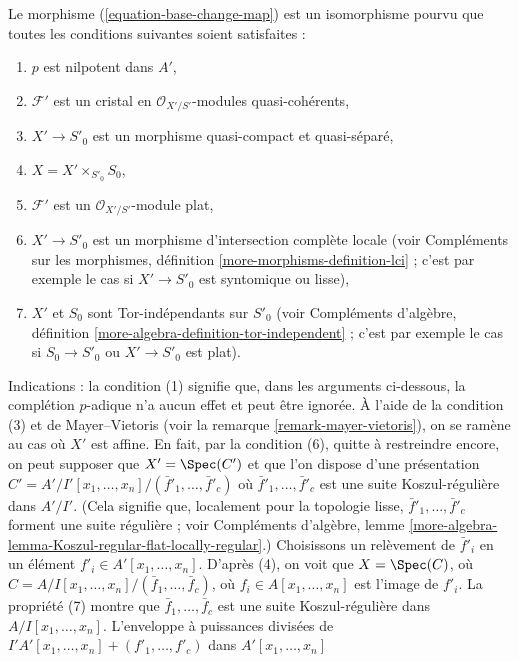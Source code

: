 \begin{remark}
\label{remark-base-change-isomorphism}
Le morphisme (\ref{equation-base-change-map}) est un isomorphisme pourvu que
toutes les conditions suivantes soient satisfaites :
\begin{enumerate}
\item $p$ est nilpotent dans $A'$,
\item $\mathcal{F}'$ est un cristal en
$\mathcal{O}_{X'/S'}$-modules quasi-cohérents,
\item $X' \to S'_0$ est un morphisme quasi-compact et quasi-séparé,
\item $X = X' \times_{S'_0} S_0$,
\item $\mathcal{F}'$ est un $\mathcal{O}_{X'/S'}$-module plat,
\item $X' \to S'_0$ est un morphisme d'intersection complète locale (voir
Compléments sur les morphismes, définition \ref{more-morphisms-definition-lci} ; c'est
par exemple le cas si $X' \to S'_0$ est syntomique ou lisse),
\item $X'$ et $S_0$ sont Tor-indépendants sur $S'_0$ (voir
Compléments d'algèbre, définition \ref{more-algebra-definition-tor-independent} ;
c'est par exemple le cas si $S_0 \to S'_0$ ou $X' \to S'_0$ est plat).
\end{enumerate}
Indications : la condition (1) signifie que, dans les arguments ci-dessous, la complétion $p$-adique
n'a aucun effet et peut être ignorée.
À l'aide de la condition (3) et de Mayer--Vietoris (voir la
remarque \ref{remark-mayer-vietoris}), on se ramène au cas
où $X'$ est affine. En fait, par la condition (6), quitte à restreindre encore,
on peut supposer que $X' = \Spec(C')$ et que l'on dispose d'une présentation
$C' = A'/I'[x_1, \ldots, x_n]/(\bar f'_1, \ldots, \bar f'_c)$
où $\bar f'_1, \ldots, \bar f'_c$ est une suite Koszul-régulière dans $A'/I'$.
(Cela signifie que, localement pour la topologie lisse, $\bar f'_1, \ldots, \bar f'_c$ forment
une suite régulière ; voir Compléments d'algèbre,
lemme \ref{more-algebra-lemma-Koszul-regular-flat-locally-regular}.)
Choisissons un relèvement de
$\bar f'_i$ en un élément $f'_i \in A'[x_1, \ldots, x_n]$. D'après (4), on voit que
$X = \Spec(C)$, où $C = A/I[x_1, \ldots, x_n]/(\bar f_1, \ldots, \bar f_c)$,
où $f_i \in A[x_1, \ldots, x_n]$ est l'image de $f'_i$.
La propriété (7) montre que $\bar f_1, \ldots, \bar f_c$ est une suite Koszul-régulière
dans $A/I[x_1, \ldots, x_n]$. L'enveloppe à puissances divisées de
$I'A'[x_1, \ldots, x_n] + (f'_1, \ldots, f'_c)$ dans $A'[x_1, \ldots, x_n]$

\end{remark}
